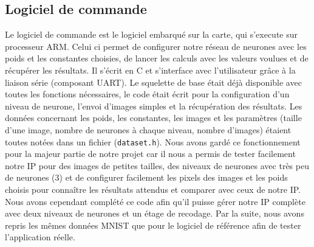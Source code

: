 \subsection{Logiciel de commande}
Le logiciel de commande est le logiciel embarqué sur la carte, qui s'execute
sur processeur ARM. Celui ci permet de configurer notre réseau de neurones avec
les poids et les constantes choisies, de lancer les calculs avec les valeurs
voulues et de récupérer les résultats. Il s'écrit en C et s'interface avec
l'utilisateur grâce à la liaison série (composant UART). Le squelette de base
était déjà disponible avec toutes les fonctions nécessaires, le code était
écrit pour la configuration d'un niveau de neurone, l'envoi d'images simples et
la récupération des résultats. Les données
concernant les poids, les constantes, les images et les paramètres (taille d'une
image, nombre de neurones à chaque niveau, nombre d'images) étaient toutes notées
dans un fichier (\texttt{dataset.h}). Nous avons gardé ce fonctionnement pour la
majeur partie de notre projet car il nous a permis de tester facilement notre
IP pour des images de petites tailles, des niveaux de neurones avec très peu
de neurones (3) et de configurer facilement les pixels des images et les poids
choisis pour connaître les résultats attendus et comparer avec ceux de notre IP.
Nous avons cependant complété ce code afin qu'il puisse gérer notre IP complète
avec deux niveaux de neurones et un étage de recodage.
Par la suite, nous avons repris les mêmes données MNIST que pour le logiciel de
référence afin de tester l'application réelle. \\
